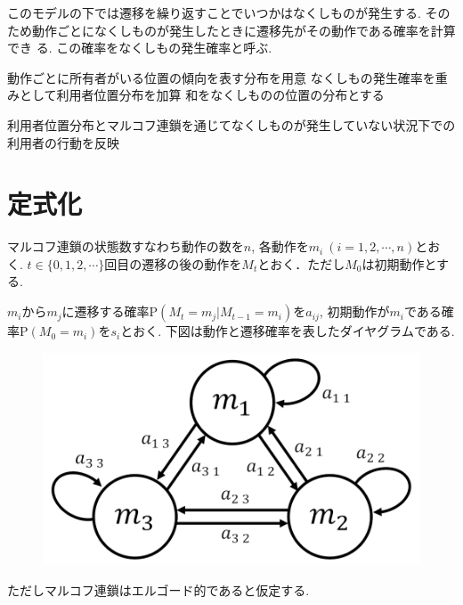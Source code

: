 このモデルの下では遷移を繰り返すことでいつかはなくしものが発生する.
そのため動作ごとになくしものが発生したときに遷移先がその動作である確率を計算でき
る.
この確率をなくしもの発生確率と呼ぶ.


動作ごとに所有者がいる位置の傾向を表す分布を用意
なくしもの発生確率を重みとして利用者位置分布を加算
和をなくしものの位置の分布とする

利用者位置分布とマルコフ連鎖を通じてなくしものが発生していない状況下での利用者の行動を反映

\section{定式化}
マルコフ連鎖の状態数すなわち動作の数を$ n $, 各動作を$ m_i\ (i=1,2,\cdots ,n)$とおく. 
$ t \in \{0,1,2,\cdots\} $回目の遷移の後の動作を$ M_t $とおく．ただし$ M_0 $は初期動作とする. 

$ m_i $から$ m_j $に遷移する確率$ \mathrm{P}(M_t = m_j | M_{t-1} = m_i) $を$ a_{i j} $, 
初期動作が$ m_i $である確率$ \mathrm{P}(M_0 = m_i) $を$ s_i $とおく. 
下図は動作と遷移確率を表したダイヤグラムである. 
\begin{figure}[H]
    \begin{center}
    \includegraphics[width=0.5\linewidth]{figs/tr_prob.png}
    \label{fig:a}
    \end{center}
\end{figure}

ただしマルコフ連鎖はエルゴード的\cite{funaki}であると仮定する. 

